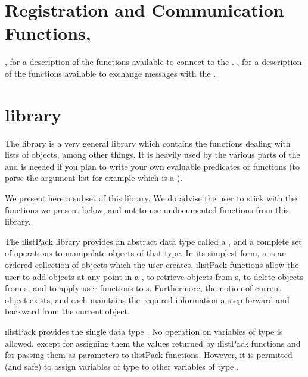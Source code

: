 \section{Registration and Communication Functions, \protect{}}

, for a description of the
functions available to connect to the \MP{}. , for a
description of the functions available to exchange messages with the \MP{}.

\section{\protect{} library}

The  library is a very general library which contains the
functions dealing with lists of objects, among other things. It is
heavily used by the various parts of the \COPRSDE{} and is needed if you
plan to write your own evaluable predicates or functions (to parse the
argument list for example which is a ).

We present here a subset of this library. We do advise the user to
stick with the functions we present below, and not to use
undocumented functions from this library.

The \i{listPack} library provides an abstract data type called a
, and a complete set of operations to manipulate objects of that
type. In its simplest form, a  is an ordered collection of
objects which the user creates. \i{listPack} functions allow the user to
add objects at any point in a , to retrieve objects from
s, to delete objects from s, and to apply user
functions to
s.  Furthermore, the notion of current object exists, and
each  maintains the required information a step forward and
backward
from the current object.

\i{listPack} provides the single data type . No operation on
variables of type  is allowed, except for assigning them the
values returned by \i{listPack} functions and for passing them as
parameters to \i{listPack} functions. However, it is permitted (and safe)
to
assign variables of type  to other variables of type
.



